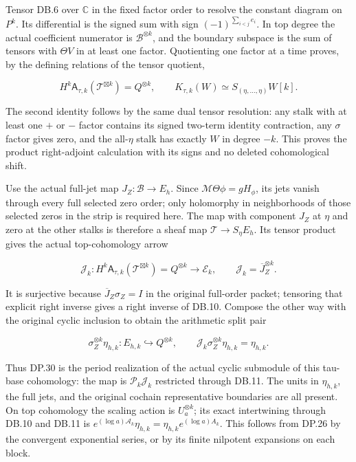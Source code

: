 Tensor DB.6 over \(\mathbb C\) in the fixed factor order to resolve the constant diagram on \(P^k\). Its differential is the signed sum with sign \((-1)^{\sum_{i<j}e_i}\). In top degree the actual coefficient numerator is \(\mathscr B^{\otimes k}\), and the boundary subspace is the sum of tensors with \(\Theta V\) in at least one factor. Quotienting one factor at a time proves, by the defining relations of the tensor quotient,

\[
H^k\mathsf A_{\tau,k}(\mathcal T^{\boxtimes k})
=Q^{\otimes k},\qquad
K_{\tau,k}(W)\simeq S_{(\eta,\ldots,\eta)}W[k].
\tag{DB.9}
\]

The second identity follows by the same dual tensor resolution: any stalk with at least one \(+\) or \(-\) factor contains its signed two-term identity contraction, any \(\sigma\) factor gives zero, and the all-\(\eta\) stalk has exactly \(W\) in degree \(-k\). This proves the product right-adjoint calculation with its signs and no deleted cohomological shift.

Use the actual full-jet map \(J_Z:\mathscr B\to E_h\). Since \(\mathcal M\Theta\phi=gH_\phi\), its jets vanish through every full selected zero order; only holomorphy in neighborhoods of those selected zeros in the strip is required here. The map with component \(J_Z\) at \(\eta\) and zero at the other stalks is therefore a sheaf map \(\mathcal T\to S_\eta E_h\). Its tensor product gives the actual top-cohomology arrow

\[
\mathcal J_k:
H^k\mathsf A_{\tau,k}(\mathcal T^{\boxtimes k})=Q^{\otimes k}
\longrightarrow\mathcal E_k,
\qquad\mathcal J_k=\overline J_Z^{\otimes k}.
\tag{DB.10}
\]

It is surjective because \(\overline J_Z\sigma_Z=I\) in the original full-order packet; tensoring that explicit right inverse gives a right inverse of DB.10. Compose the other way with the original cyclic inclusion to obtain the arithmetic split pair

\[
\sigma_Z^{\otimes k}\eta_{h,k}:E_{h,k}\hookrightarrow Q^{\otimes k},
\qquad
\mathcal J_k\sigma_Z^{\otimes k}\eta_{h,k}=\eta_{h,k}.
\tag{DB.11}
\]

Thus DP.30 is the period realization of the actual cyclic submodule of this tau-base cohomology: the map is \(\mathscr P_k\mathcal J_k\) restricted through DB.11. The units in \(\eta_{h,k}\), the full jets, and the original cochain representative boundaries are all present. On top cohomology the scaling action is \(U_a^{\otimes k}\); its exact intertwining through DB.10 and DB.11 is \(e^{(\log a)\mathcal A_k}\eta_{h,k}=\eta_{h,k}e^{(\log a)A_k}\). This follows from DP.26 by the convergent exponential series, or by its finite nilpotent expansions on each block.

